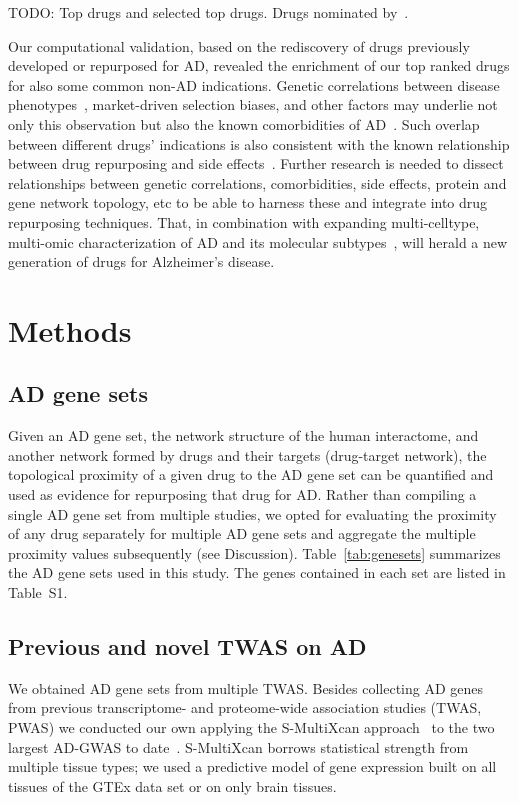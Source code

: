 \documentclass[letterpaper]{article}
\begin{document}
TODO: Top drugs and selected top drugs.  Drugs nominated
by~\cite{Fang2021,Taubes2021}.

Our computational validation, based on the rediscovery of drugs previously
developed or repurposed for AD, revealed the enrichment of our top ranked
drugs for also some common non-AD indications.  Genetic correlations between
disease phenotypes~\citep{Consortium2018}, market-driven selection biases, and
other factors may underlie not only this observation but also the known
comorbidities of AD~\citep{Santiago2021}.  Such overlap between different
drugs' indications is also consistent with the known relationship between drug
repurposing and side effects~\citep{Ye2014}.  Further research is needed to
dissect relationships between genetic correlations, comorbidities, side
effects, protein and gene network topology, etc to be able to harness these and
integrate into drug repurposing techniques.  That, in combination with
expanding multi-celltype, multi-omic characterization of AD and its molecular
subtypes~\citep{Neff2021}, will herald a new generation of drugs for
Alzheimer's disease.

\section{Methods}

\subsection{AD gene sets}

Given an AD gene set, the network structure of the human interactome, and
another network formed by drugs and their targets (drug-target network), the
topological proximity of a given drug to the AD gene set can be
quantified\citep{Guney2016} and used as evidence for repurposing that drug for
AD.  Rather than compiling a single AD gene set from multiple studies, we
opted for evaluating the proximity of any drug separately for multiple AD gene
sets and aggregate the multiple proximity values subsequently (see
Discussion).  Table~\ref{tab:genesets} summarizes the AD gene sets used in
this study.  The genes contained in each set are listed in Table~S1.

\subsection{Previous and novel TWAS on AD}

We obtained AD gene sets from multiple TWAS.  Besides collecting
AD genes from previous transcriptome- and proteome-wide association studies
(TWAS, PWAS) we
conducted our own applying the S-MultiXcan approach~\citep{Barbeira2018} to
the two largest AD-GWAS to date~\citep{Schwartzentruber2021,Wightman2021}.
S-MultiXcan borrows statistical strength from multiple tissue types; we used a
predictive model of gene expression built on all tissues of the GTEx data set
or on only brain tissues.
\end{document}
